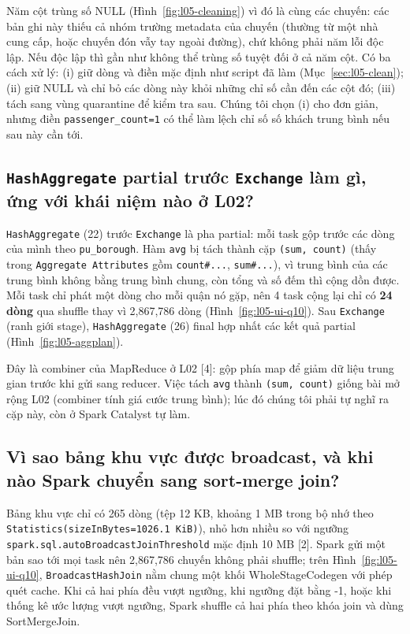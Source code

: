 \documentclass[
  12pt,
  a4paper,
]{report}
\begin{document}
Năm cột trùng số NULL (Hình~\ref{fig:l05-cleaning}) vì đó là cùng các
chuyến: các bản ghi này thiếu cả nhóm trường metadata của chuyến (thường
từ một nhà cung cấp, hoặc chuyến đón vẫy tay ngoài đường), chứ không
phải năm lỗi độc lập. Nếu độc lập thì gần như không thể trùng số tuyệt
đối ở cả năm cột. Có ba cách xử lý: (i) giữ dòng và điền mặc định như
script đã làm (Mục~\ref{sec:l05-clean}); (ii) giữ NULL và chỉ bỏ các
dòng này khỏi những chỉ số cần đến các cột đó; (iii) tách sang vùng
quarantine để kiểm tra sau. Chúng tôi chọn (i) cho đơn giản, nhưng điền
\texttt{passenger\_}\allowbreak{}\texttt{count=}\allowbreak{}\texttt{1}\allowbreak{}
có thể làm lệch chỉ số số khách trung bình nếu sau này cần tới.

\subsection{\texorpdfstring{\texttt{HashAggregate} partial trước
\texttt{Exchange} làm gì, ứng với khái niệm nào ở
L02?}{HashAggregate partial trước Exchange làm gì, ứng với khái niệm nào ở L02?}}\label{sec:l05-q5}

\texttt{HashAggregate} (22) trước \texttt{Exchange} là pha partial: mỗi
task gộp trước các dòng của mình theo \texttt{pu\_borough}. Hàm
\texttt{avg} bị tách thành cặp \texttt{(sum,\ count)} (thấy trong
\texttt{Aggregate\ Attributes}\allowbreak{} gồm \texttt{count\#...},
\texttt{sum\#...}), vì trung bình của các trung bình không bằng trung
bình chung, còn tổng và số đếm thì cộng dồn được. Mỗi task chỉ phát một
dòng cho mỗi quận nó gặp, nên 4 task cộng lại chỉ có \textbf{24 dòng}
qua shuffle thay vì 2,867,786 dòng (Hình~\ref{fig:l05-ui-q10}). Sau
\texttt{Exchange} (ranh giới stage), \texttt{HashAggregate} (26) final
hợp nhất các kết quả partial (Hình~\ref{fig:l05-aggplan}).

Đây là combiner của MapReduce ở L02 {[}4{]}: gộp phía map để giảm dữ
liệu trung gian trước khi gửi sang reducer. Việc tách \texttt{avg} thành
\texttt{(sum,\ count)} giống bài mở rộng L02 (combiner tính giá cước
trung bình); lúc đó chúng tôi phải tự nghĩ ra cặp này, còn ở Spark
Catalyst tự làm.

\subsection{Vì sao bảng khu vực được broadcast, và khi nào Spark chuyển
sang sort-merge join?}\label{sec:l05-q6}

Bảng khu vực chỉ có 265 dòng (tệp 12 KB, khoảng 1 MB trong bộ nhớ theo
\texttt{Statistics(sizeInBytes=}\allowbreak{}\texttt{1026.}\allowbreak{}\texttt{1\ KiB)}\allowbreak{}),
nhỏ hơn nhiều so với ngưỡng
\texttt{spark.}\allowbreak{}\texttt{sql.}\allowbreak{}\texttt{autoBroadcastJoinThreshold}\allowbreak{}
mặc định 10 MB {[}2{]}. Spark gửi một bản sao tới mọi task nên 2,867,786
chuyến không phải shuffle; trên Hình~\ref{fig:l05-ui-q10},
\texttt{BroadcastHashJoin}\allowbreak{} nằm chung một khối
WholeStageCodegen với phép quét cache. Khi cả hai phía đều vượt ngưỡng,
khi ngưỡng đặt bằng -1, hoặc khi thống kê ước lượng vượt ngưỡng, Spark
shuffle cả hai phía theo khóa join và dùng SortMergeJoin.
\end{document}
